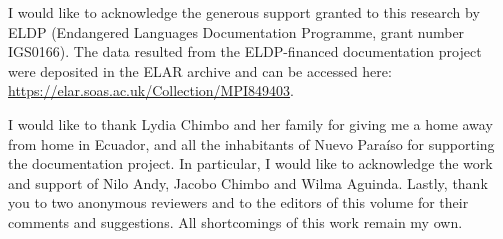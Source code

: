 \documentclass[output=paper]{langscibook}
\begin{document}
I would like to acknowledge the generous support granted to this research by ELDP (Endangered Languages Documentation Programme, grant number IGS0166). The data resulted from the ELDP-financed documentation project were deposited in the ELAR archive and can be accessed here: \url{https://elar.soas.ac.uk/Collection/MPI849403}. 

I would like to thank Lydia Chimbo and her family for giving me a home away from home in Ecuador, and all the inhabitants of Nuevo Paraíso for supporting the documentation project. In particular, I would like to acknowledge the work and support of Nilo Andy, Jacobo Chimbo and Wilma Aguinda. Lastly, thank you to two anonymous reviewers and to the editors of this volume for their comments and suggestions. All shortcomings of this work remain my own. 
 
 
\end{document}
